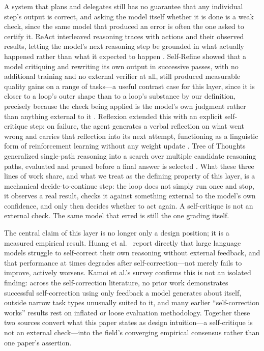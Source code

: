 \documentclass[journal]{IEEEtran}
\begin{document}
A system that plans and delegates still has no guarantee that any individual step's output is correct, and asking the model itself whether it is done is a weak check, since the same model that produced an error is often the one asked to certify it. ReAct interleaved reasoning traces with actions and their observed results, letting the model's next reasoning step be grounded in what actually happened rather than what it expected to happen \cite{yao2022react}. Self-Refine showed that a model critiquing and rewriting its own output in successive passes, with no additional training and no external verifier at all, still produced measurable quality gains on a range of tasks---a useful contrast case for this layer, since it is closer to a loop's outer shape than to a loop's substance by our definition, precisely because the check being applied is the model's own judgment rather than anything external to it \cite{madaan2023selfrefine}. Reflexion extended this with an explicit self-critique step: on failure, the agent generates a verbal reflection on what went wrong and carries that reflection into its next attempt, functioning as a linguistic form of reinforcement learning without any weight update \cite{shinn2023reflexion}. Tree of Thoughts generalized single-path reasoning into a search over multiple candidate reasoning paths, evaluated and pruned before a final answer is selected \cite{yao2023tree}. What these three lines of work share, and what we treat as the defining property of this layer, is a mechanical decide-to-continue step: the loop does not simply run once and stop, it observes a real result, checks it against something external to the model's own confidence, and only then decides whether to act again. A self-critique is not an external check. The same model that erred is still the one grading itself.

The central claim of this layer is no longer only a design position; it is a measured empirical result. Huang et al.\ \cite{huang2023large} report directly that large language models struggle to self-correct their own reasoning without external feedback, and that performance at times degrades after self-correction---not merely fails to improve, actively worsens. Kamoi et al.'s survey \cite{kamoi2024can} confirms this is not an isolated finding: across the self-correction literature, no prior work demonstrates successful self-correction using only feedback a model generates about itself, outside narrow task types unusually suited to it, and many earlier ``self-correction works'' results rest on inflated or loose evaluation methodology. Together these two sources convert what this paper states as design intuition---a self-critique is not an external check---into the field's converging empirical consensus rather than one paper's assertion.
\end{document}
